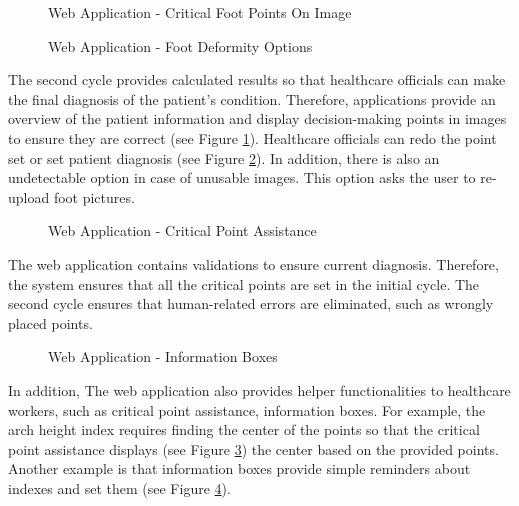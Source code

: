 \begin{figure}[htbp]
\centering
{}
\caption{Web Application - Critical Foot Points On Image}
\label{fig:WebApplicationFootPoints}
\end{figure}

\begin{figure}[htbp]
\centering
{}
\caption{Web Application - Foot Deformity Options}
\label{fig:WebApplicationSetFootDeformity}
\end{figure}

The second cycle provides calculated results so that healthcare officials can make the final diagnosis of the patient's condition. Therefore, applications provide an overview of the patient information and display decision-making points in images to ensure they are correct (see Figure \ref{fig:WebApplicationFootPoints}). Healthcare officials can redo the point set or set patient diagnosis (see Figure \ref{fig:WebApplicationSetFootDeformity}). In addition, there is also an undetectable option in case of unusable images. This option asks the user to re-upload foot pictures.

\begin{figure}[htbp]
\centering
{}
\caption{Web Application - Critical Point Assistance}
\label{fig:WebApplicationCriticalPointAssistance}
\end{figure}

The web application contains validations to ensure current diagnosis. Therefore, the system ensures that all the critical points are set in the initial cycle. The second cycle ensures that human-related errors are eliminated, such as wrongly placed points. 

\begin{figure}[htbp]
\centering
{}
\caption{Web Application - Information Boxes}
\label{fig:WebApplicationInformationBoxes}
\end{figure}

In addition, The web application also provides helper functionalities to healthcare workers, such as critical point assistance, information boxes. For example, the arch height index requires finding the center of the points so that the critical point assistance displays (see Figure \ref{fig:WebApplicationCriticalPointAssistance}) the center based on the provided points. Another example is that information boxes provide simple reminders about indexes and set them (see Figure \ref{fig:WebApplicationInformationBoxes}).

